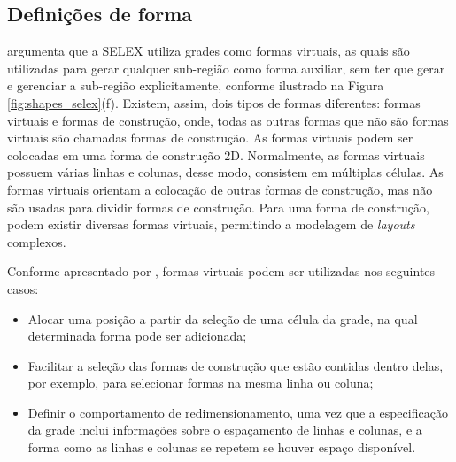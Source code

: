 \subsection{Definições de forma}
\label{sec:selex_definicao_formas}

 argumenta que a \gls{SELEX} utiliza grades como formas virtuais, as quais são utilizadas para gerar qualquer sub-região como forma auxiliar, sem ter que gerar e gerenciar a sub-região explicitamente, conforme ilustrado na Figura \ref{fig:shapes_selex}(f). Existem, assim, dois tipos de formas diferentes: formas virtuais e formas de construção, onde, todas as outras formas que não são formas virtuais são chamadas formas de construção. As formas virtuais podem ser colocadas em uma forma de construção 2D. Normalmente, as formas virtuais possuem várias linhas e colunas, desse modo, consistem em múltiplas células. As formas virtuais orientam a colocação de outras formas de construção, mas não são usadas para dividir formas de construção. Para uma forma de construção, podem existir diversas formas virtuais, permitindo a modelagem de \textit{layouts} complexos. 

Conforme apresentado por , formas virtuais podem ser utilizadas nos seguintes casos:

\begin{itemize}
    \item Alocar uma posição a partir da seleção de uma célula da grade, na qual determinada forma pode ser adicionada;
    
    \item Facilitar a seleção das formas de construção que estão contidas dentro delas, por exemplo, para selecionar formas na mesma linha ou coluna;
    
    \item Definir o comportamento de redimensionamento, uma vez que a especificação da grade inclui informações sobre o espaçamento de linhas e colunas, e a forma como as linhas e colunas se repetem se houver espaço  disponível.
\end{itemize}

\begin{figure}[h!]
	\centering
	\captionsetup{width=15cm}
	{}	
\end{figure}

